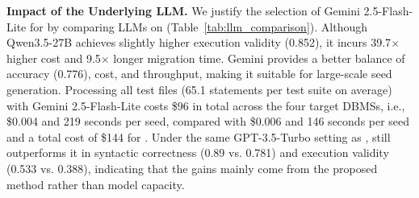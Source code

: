 \documentclass[conference]{IEEEtran}
\begin{document}
\textbf{Impact of the Underlying LLM.}
We justify the selection of Gemini 2.5-Flash-Lite for \tool{} by comparing LLMs on \monetdb{} (Table~\ref{tab:llm_comparison}). Although Qwen3.5-27B achieves slightly higher execution validity (0.852), it incurs 39.7$\times$ higher cost and 9.5$\times$ longer migration time. Gemini provides a better balance of accuracy (0.776), cost, and throughput, making it suitable for large-scale seed generation. Processing all test files (65.1 statements per test suite on average) with Gemini 2.5-Flash-Lite costs \$96 in total across the four target DBMSs, i.e., \$0.004 and 219 seconds per seed, compared with \$0.006 and 146 seconds per seed and a total cost of \$144 for \sedar{}.
Under the same GPT-3.5-Turbo setting as \sedar{}, \tool{} still outperforms it in syntactic correctness (0.89 vs. 0.781) and execution validity (0.533 vs. 0.388), indicating that the gains mainly come from the proposed method rather than model capacity.

\end{document}
